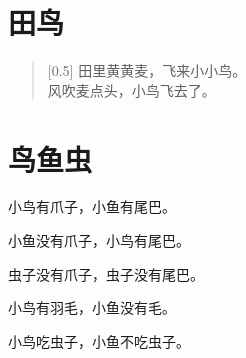 \documentclass[12pt,UTF-8,openany]{ctexbook}
\begin{document}
\hanzibox{}\hanzibox{}\hanzibox{}\hanzibox{}\hspace{1em}\hanzibox{}\hanzibox{}\hanzibox{}\hanzibox{}

\hanzibox{}\hanzibox{}\hanzibox{}\hanzibox{}\hspace{1em}\hanzibox{}\hanzibox{}\hanzibox{}\hanzibox{}






\chapter{田鸟}

\begin{large}
    
    \begin{verse}[0.5\linewidth]
        田里黄黄麦，飞来小小鸟。 \\
        风吹麦点头，小鸟飞去了。
    \end{verse}
    
\end{large}


\clearpage

\begin{center}
    
\end{center}


\hanzibox{}\hanzibox{}\hanzibox{}\hanzibox{}\hspace{1em}\hanzibox{}\hanzibox{}\hanzibox{}\hanzibox{}

\hanzibox{}\hanzibox{}\hanzibox{}\hanzibox{}\hspace{1em}\hanzibox{}\hanzibox{}\hanzibox{}\hanzibox{}

\hanzibox{}\hanzibox{}\hanzibox{}\hanzibox{}\hspace{1em}\hanzibox{}\hanzibox{}\hanzibox{}\hanzibox{}






\chapter{鸟鱼虫}

\begin{large}
    
    小鸟有爪子，小鱼有尾巴。
    
    小鱼没有爪子，小鸟有尾巴。
    
    虫子没有爪子，虫子没有尾巴。
    
    小鸟有羽毛，小鱼没有毛。
    
    小鸟吃虫子，小鱼不吃虫子。
    
\end{large}
\end{document}
